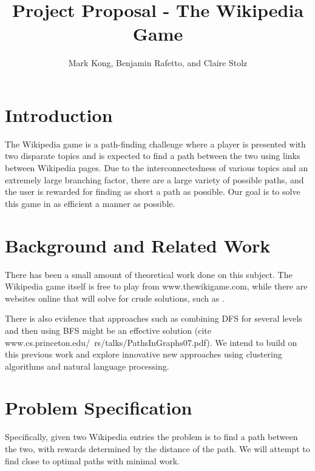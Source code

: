 \documentclass[11pt]{article}
\title{Project Proposal - The Wikipedia Game}
\author{Mark Kong, Benjamin Rafetto, and Claire Stolz}
\begin{document}
\maketitle{}


\section{Introduction}

The Wikipedia game \cite{www.thewikigame.com} is a path-finding challenge where a player is presented with two disparate topics and is expected to find a path between the two using links between Wikipedia pages. Due to the interconnectedness of various topics and an extremely large branching factor, there are a large variety of possible paths, and the user is rewarded for finding as short a path as possible. Our goal is to solve this game in as efficient a manner as possible.


\section{Background and Related Work}

There has been a small amount of theoretical work done on this subject. The Wikipedia game itself is free to play from www.thewikigame.com, while there are websites online that will solve for crude solutions, such as \cite{www.sixdegreesofwikipedia.com}.

There is also evidence that approaches such as combining DFS for several levels and then using BFS might be an effective solution (cite www.cs.princeton.edu/~rs/talks/PathsInGraphs07.pdf). We intend to build on this previous work and explore innovative new approaches using clustering algorithms and natural language processing.


\section{Problem Specification}

Specifically, given two Wikipedia entries the problem is to find a path between the two, with rewards determined by the distance of the path. We will attempt to find close to optimal paths with minimal work.
\end{document}
